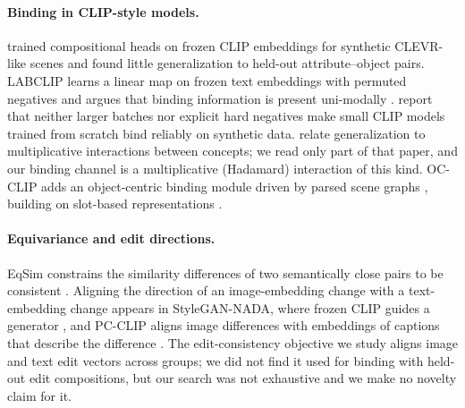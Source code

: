 \paragraph{Binding in CLIP-style models.}
\citet{lewis2024clipbind} trained compositional heads on frozen CLIP embeddings for synthetic
CLEVR-like scenes and found little generalization to held-out attribute--object pairs. LABCLIP
learns a linear map on frozen text embeddings with permuted negatives and argues that binding
information is present uni-modally \citep{koishigarina2025labclip}. \citet{gurung2025binding}
report that neither larger batches nor explicit hard negatives make small CLIP models trained from
scratch bind reliably on synthetic data. \citet{uselis2026bind} relate generalization to
multiplicative interactions between concepts; we read only part of that paper, and our binding
channel is a multiplicative (Hadamard) interaction of this kind. OC-CLIP adds an object-centric
binding module driven by parsed scene graphs \citep{assouel2025occlip}, building on slot-based
representations \citep{locatello2020slot}.

\paragraph{Equivariance and edit directions.}
EqSim constrains the similarity differences of two semantically close pairs to be consistent
\citep{wang2023eqsim}. Aligning the direction of an image-embedding change with a text-embedding
change appears in StyleGAN-NADA, where frozen CLIP guides a generator \citep{gal2021stylegannada},
and PC-CLIP aligns image differences with embeddings of captions that describe the difference
\citep{sam2024pcclip}. The edit-consistency objective we study aligns image and text edit vectors
across groups; we did not find it used for binding with held-out edit compositions, but our search
was not exhaustive and we make no novelty claim for it.
